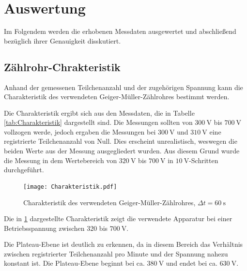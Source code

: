 \section{Auswertung}

Im Folgendem werden die erhobenen Messdaten ausgewertet und abschließend
bezüglich ihrer Genauigkeit disskutiert.

\subsection{Zählrohr-Chrakteristik}

Anhand der gemessenen Teilchenanzahl und der zugehörigen Spannung kann die
Charakteristik des verwendeten Geiger-Müller-Zählrohres bestimmt werden.

Die Charakteristik ergibt sich aus den Messdaten, die in Tabelle \ref{tab:Charakteristik}
dargestellt sind. Die Messungen sollten von $\SI{300}{\volt}$ bis $\SI{700}{\volt}$
vollzogen werde, jedoch ergaben die Messungen bei $\SI{300}{\volt}$ und
$\SI{310}{\volt}$ eine registrierte Teilchenanzahl von Null.
Dies erscheint unrealistisch, weswegen die beiden Werte aus der Messung ausgegliedert
wurden. Aus diesem Grund wurde die Messung in dem Wertebereich
von $\SI{320}{\volt}$ bis $\SI{700}{\volt}$ in $\SI{10}{\volt}$-Schritten
durchgeführt.

\begin{figure}
  \centering
  \texttt{[image: Charakteristik.pdf]}
  \caption{Charakteristik des verwendeten Geiger-Müller-Zählrohres, $\Delta t = \SI{60}{\second}$}
  \label{fig:Charakteristik}
\end{figure}

Die in \ref{fig:Charakteristik} dargestellte Charakteristik zeigt die verwendete
Apparatur bei einer Betriebsspannung zwischen $\num{320}$ bis $\SI{700}{\volt}$.

Die Plateau-Ebene ist deutlich zu erkennen, da in diesem Bereich das Verhältnis zwischen
registrierter Teilchenanzahl pro Minute und der Spannung nahezu konstant ist.
Die Plateau-Ebene beginnt bei ca. $\SI{380}{\volt}$ und endet bei ca.
$\SI{630}{\volt}$.

